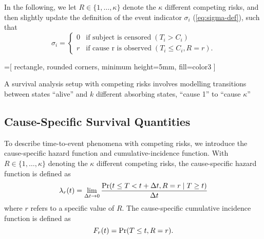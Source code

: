 In the following, 
we let \(R \in \{1, \dots, \kappa\}\) denote the \(\kappa\) different competing risks,
and then slightly update the definition of the event indicator \(\sigma_i\)
(\cref{eq:sigma-def}), such that
\begin{equation}
    \label{eq:sigma-def-2}
    \sigma_i =
        \begin{cases}
            0 & \text{if subject is censored} \; (T_i >    C_i) \\
            r & \text{if cause r is observed} \; (T_i \leq C_i, R = r).
        \end{cases}
\end{equation}

\begin{marginfigure}%
    =[%
        rectangle, rounded corners, minimum height=5mm, fill=color3
    ]
    \centering
    \caption[A Multi-State Model]{
        A survival analysis setup with competing risks
        involves modelling transitions between states 
        \enquote{alive} and \(k\) different absorbing
        states, \enquote{cause 1} to \enquote{cause \(\kappa\)}
    }
    \label{fig:msm}
\end{marginfigure}

\subsection{Cause-Specific Survival Quantities}

To describe time-to-event phenomena with competing risks, 
we introduce the cause-specific hazard function and 
cumulative-incidence function.
With \(R \in \{1, \dots, \kappa\}\) denoting the \(\kappa\) different competing risks, 
the cause-specific hazard function is defined as
\begin{equation}
    \lambda_r(t) = \lim_{\Delta t \to 0} 
        \frac{\operatorname{\Pr} (t \leq T < t + \Delta t, R=r \mid T \geq t)}{\Delta t}
\end{equation}
where \(r\) refers to a specific value of \(R\).
The cause-specific cumulative incidence function is defined as
~\autocite{kalbfleischStatistical2002}
\begin{equation}
    F_r(t) = \operatorname{\Pr}(T \leq t, R = r).
\end{equation}

